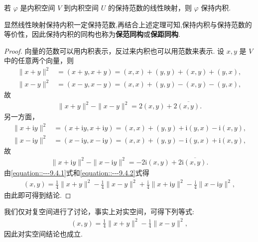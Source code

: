 \documentclass[../../main.tex]{subfiles}
\begin{document}
\begin{theorem}\label{theorem:保范线性映射一定保持内积}
若 $\varphi$ 是内积空间 $V$ 到内积空间 $U$ 的保持范数的线性映射，则 $\varphi$ 保持内积.
\end{theorem}
\begin{remark}
显然线性映射保持内积一定保持范数,再结合上述定理可知,保持内积与保持范数的等价性，因此保持内积的同构也称为\textbf{保范同构}或\textbf{保距同构}. 
\end{remark}
\begin{proof}
向量的范数可以用内积表示，反过来内积也可以用范数来表示. 设 $x,y$ 是 $V$ 中的任意两个向量，则
\begin{align*}
\|x + y\|^2&=(x + y,x + y)=(x,x)+(y,y)+(x,y)+(y,x),\\
\|x - y\|^2&=(x - y,x - y)=(x,x)+(y,y)-(x,y)-(y,x),
\end{align*}
故
\begin{align}
\|x + y\|^2 - \|x - y\|^2 = 2(x,y) + 2\overline{(x,y)}.\label{equation::---9.4.1}
\end{align}
另一方面，
\begin{align*}
\|x + \mathrm{i}y\|^2&=(x + \mathrm{i}y,x + \mathrm{i}y)=(x,x)+(y,y)+\mathrm{i}(y,x)-\mathrm{i}(x,y),\\
\|x - \mathrm{i}y\|^2&=(x - \mathrm{i}y,x - \mathrm{i}y)=(x,x)+(y,y)-\mathrm{i}(y,x)+\mathrm{i}(x,y),
\end{align*}
故
\begin{align}
\|x + \mathrm{i}y\|^2 - \|x - \mathrm{i}y\|^2 = -2\mathrm{i}(x,y) + 2\mathrm{i}\overline{(x,y)}.\label{equation::---9.4.2}
\end{align}
由\eqref{equation::---9.4.1}式和\eqref{equation::---9.4.2}式得
\begin{align*}
(x,y) = \frac{1}{4}\|x + y\|^2 - \frac{1}{4}\|x - y\|^2 + \frac{\mathrm{i}}{4}\|x + \mathrm{i}y\|^2 - \frac{\mathrm{i}}{4}\|x - \mathrm{i}y\|^2,
\end{align*}
由此即可得到结论.

\end{proof}
\begin{remark}
我们仅对复空间进行了讨论，事实上对实空间，可得下列等式:
\begin{align*}
(x,y) = \frac{1}{4}\|x + y\|^2 - \frac{1}{4}\|x - y\|^2,
\end{align*}
因此对实空间结论也成立. 
\end{remark}
\end{document}
